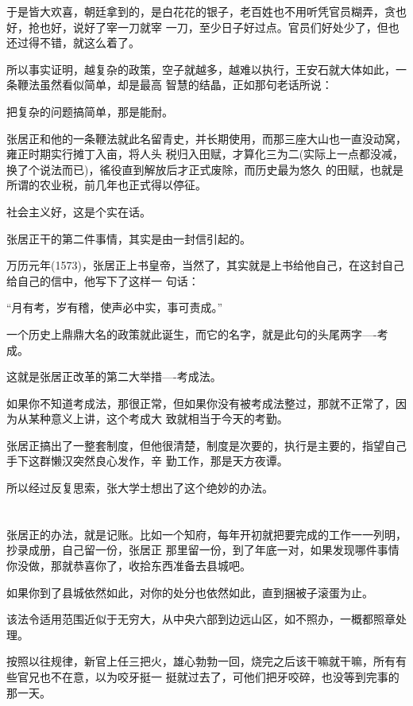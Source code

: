 \documentclass[11pt,a4paper,onecolumn]{article}
\begin{document}
于是皆大欢喜，朝廷拿到的，是白花花的银子，老百姓也不用听凭官员糊弄，贪也好，抢也好，说好了宰一刀就宰
一刀，至少日子好过点。官员们好处少了，但也还过得不错，就这么着了。

所以事实证明，越复杂的政策，空子就越多，越难以执行，王安石就大体如此，一条鞭法虽然看似简单，却是最高
智慧的结晶，正如那句老话所说：

把复杂的问题搞简单，那是能耐。

张居正和他的一条鞭法就此名留青史，并长期使用，而那三座大山也一直没动窝，雍正时期实行摊丁入亩，将人头
税归入田赋，才算化三为二(实际上一点都没减，换了个说法而已)，徭役直到解放后才正式废除，而历史最为悠久
的田赋，也就是所谓的农业税，前几年也正式得以停征。

社会主义好，这是个实在话。

张居正干的第二件事情，其实是由一封信引起的。

万历元年(1573)，张居正上书皇帝，当然了，其实就是上书给他自己，在这封自己给自己的信中，他写下了这样一
句话：

``月有考，岁有稽，使声必中实，事可责成。''

一个历史上鼎鼎大名的政策就此诞生，而它的名字，就是此句的头尾两字----考成。

这就是张居正改革的第二大举措----考成法。

如果你不知道考成法，那很正常，但如果你没有被考成法整过，那就不正常了，因为从某种意义上讲，这个考成大
致就相当于今天的考勤。

张居正搞出了一整套制度，但他很清楚，制度是次要的，执行是主要的，指望自己手下这群懒汉突然良心发作，辛
勤工作，那是天方夜谭。

所以经过反复思索，张大学士想出了这个绝妙的办法。

\section[\thesection]{}

张居正的办法，就是记账。比如一个知府，每年开初就把要完成的工作一一列明，抄录成册，自己留一份，张居正
那里留一份，到了年底一对，如果发现哪件事情你没做，那就恭喜你了，收拾东西准备去县城吧。

如果你到了县城依然如此，对你的处分也依然如此，直到捆被子滚蛋为止。

该法令适用范围近似于无穷大，从中央六部到边远山区，如不照办，一概都照章处理。

按照以往规律，新官上任三把火，雄心勃勃一回，烧完之后该干嘛就干嘛，所有有些官兄也不在意，以为咬牙挺一
挺就过去了，可他们把牙咬碎，也没等到完事的那一天。
\end{document}
